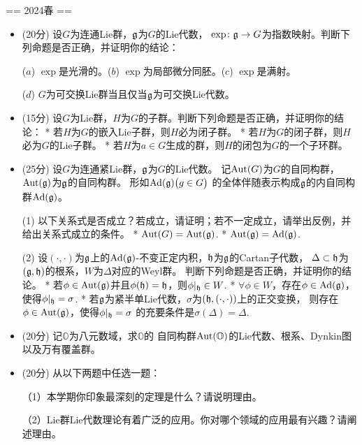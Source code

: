 == 2024春 ==

\begin{itemize}
    \item[一] (20分) 设$G$为连通Lie群，$\mathfrak{g}$为$G$的Lie代数，
    $\exp\colon\mathfrak{g}\to G$为指数映射。判断下列命题是否正确，并证明你的结论：

    ($a$) $\exp$是光滑的。\quad ($b$) $\exp$为局部微分同胚。\quad  ($c$) $\exp$是满射。

    ($d$) $G$为可交换Lie群当且仅当$\mathfrak{g}$为可交换Lie代数。

    \item[二] (15分) 设$G$为Lie群，$H$为$G$的子群。判断下列命题是否正确，并证明你的结论：
    * 若$H$为$G$的嵌入Lie子群，则$H$必为闭子群。
    * 若$H$为$G$的闭子群，则$H$必为$G$的Lie子群。
    * 若$H$为$a\in G$生成的群，则$H$的闭包为$G$的一个子环群。

    \item[三] (25分) 设$G$为连通紧Lie群，$\mathfrak{g}$为$G$的Lie代数。
    记$\operatorname{Aut}(G)$为$G$的自同构群，$\operatorname{Aut}(\mathfrak{g})$为$\mathfrak{g}$的自同构群。
    形如$\operatorname{Ad}(\mathfrak{g})\big(g\in G\big)$ 的全体伴随表示构成$\mathfrak{g}$的内自同构群$\operatorname{Ad}(\mathfrak{g})$。

    (1) 以下关系式是否成立？若成立，请证明；若不一定成立，请举出反例，并给出关系式成立的条件。
    * $\operatorname{Aut}(G)=\operatorname{Aut}(\mathfrak{g})$.
    * $\operatorname{Aut}(\mathfrak{g})=\operatorname{Ad}(\mathfrak{g})$.

    (2) 设$(\cdot,\cdot)$为$\mathfrak{g}$上的$\operatorname{Ad}(\mathfrak{g})$-不变正定内积，$\mathfrak{h}$为$\mathfrak{g}$的Cartan子代数，
    $\Delta\subset\mathfrak{h}$为$(\mathfrak{g},\mathfrak{h})$的根系，$W$为$\Delta$对应的Weyl群。
    判断下列命题是否正确，并证明你的结论。
    * 若$\phi\in\operatorname{Aut}(\mathfrak{g})$并且$\phi(\mathfrak{h})=\mathfrak{h}$，则$\phi|_{\mathfrak{h}}\in W$.
    * $\forall\phi\in W$，存在$\phi\in\operatorname{Ad}(\mathfrak{g})$，使得$\phi|_{\mathfrak{h}}=\sigma$.
    * 若$\mathfrak{g}$为紧半单Lie代数，$\sigma$为$(\mathfrak{h},(\cdot,\cdot))$上的正交变换，
    则存在$\phi\in\operatorname{Aut}(\mathfrak{g})$，使得$\phi|_{\mathfrak{h}}=\sigma$
    的充要条件是$\sigma(\Delta)=\Delta$.

    \item[四] (20分) 记$\mathbb{O}$为八元数域，求$\mathbb{O}$的
    自同构群$\operatorname{Aut}(\mathbb{O})$的Lie代数、根系、Dynkin图以及万有覆盖群。

    \item[五] (20分) 从以下两题中任选一题：

    （1）本学期你印象最深刻的定理是什么？请说明理由。

    （2）Lie群Lie代数理论有着广泛的应用。你对哪个领域的应用最有兴趣？请阐述理由。
\end{itemize}